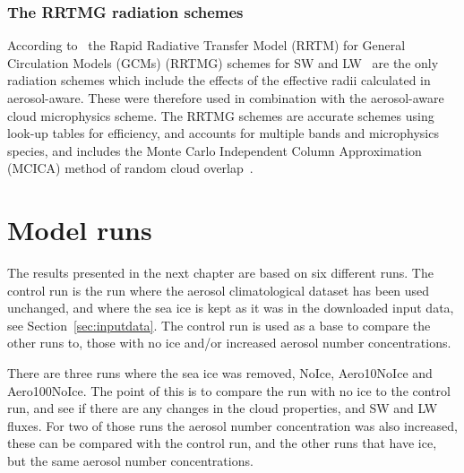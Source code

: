 \subsubsection{The RRTMG radiation schemes}
According to~\citet{Thompson2014} the Rapid Radiative Transfer Model (RRTM) for General Circulation Models (GCMs) (RRTMG) schemes for SW and LW~\citep{Mlawer1997, Iacono2000, Iacono2003, Iacono2008} are the only radiation schemes which include the effects of the effective radii calculated in aerosol-aware. These were therefore used in combination with the aerosol-aware cloud microphysics scheme. The RRTMG schemes are accurate schemes using look-up tables for efficiency, and accounts for multiple bands and microphysics species, and includes the Monte Carlo Independent Column Approximation (MCICA) method of random cloud overlap~\citep{Wang2015}.

\section{Model runs}
The results presented in the next chapter are based on six different runs. The control run is the run where the aerosol climatological dataset has been used unchanged, and where the sea ice is kept as it was in the downloaded input data, see Section~\ref{sec:inputdata}. The control run is used as a base to compare the other runs to, those with no ice and/or increased aerosol number concentrations.

There are three runs where the sea ice was removed, NoIce, Aero10NoIce and Aero100NoIce. The point of this is to compare the run with no ice to the control run, and see if there are any changes in the cloud properties, and SW and LW fluxes. For two of those runs the aerosol number concentration was also increased, these can be compared with the control run, and the other runs that have ice, but the same aerosol number concentrations.

